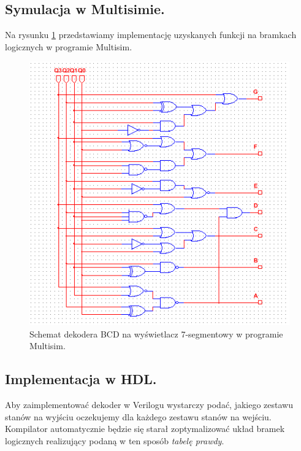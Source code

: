\documentclass[a4paper,oneside]{report}
\newcommand{\bcdtoseg}{\texttt{bcd\textunderscore to\textunderscore 7seg}}
\begin{document}
\subsection{Symulacja w Multisimie.}
Na rysunku \ref{decoder_scheme} przedstawiamy implementację
uzyskanych funkcji na bramkach logicznych w programie Multisim.
\begin{figure}[p]
\centering
\includegraphics[width=\textwidth]{bcdto7seg.png}
\caption[Schemat dekodera BCD na wyświetlacz 7-segmentowy.]{Schemat dekodera BCD na wyświetlacz 7-segmentowy w programie Multisim.}
\label{decoder_scheme}
\end{figure}
\subsection{Implementacja w HDL.}
Aby zaimplementować dekoder w Verilogu wystarczy podać, jakiego
zestawu stanów na wyjściu oczekujemy dla każdego zestawu stanów na
wejściu. Kompilator automatycznie będzie się starał zoptymalizować
układ bramek logicznych realizujący podaną w ten sposób
\emph{tabelę prawdy}.


\end{document}
